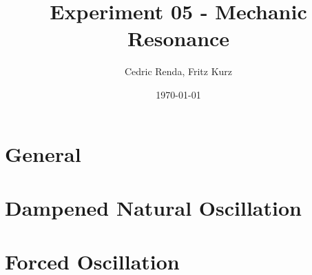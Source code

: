 \documentclass[12pt,a4paper]{article}
\title{Experiment 05 - Mechanic Resonance}
\author{Cedric Renda, Fritz Kurz}
\date{\today }
\begin{document}
\maketitle


\tableofcontents

\section{General}



\section{Dampened Natural Oscillation}
%




\section{Forced Oscillation}
%






%
\newpage

\end{document}

